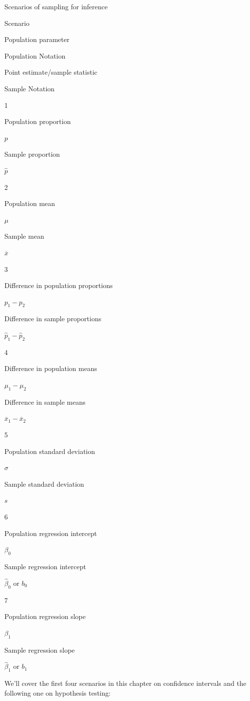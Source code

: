 \documentclass[12pt,]{krantz}
\begin{document}
\label{tab:summarytable}\label{tab:summarytable}Scenarios of sampling for
inference

Scenario

Population parameter

Population Notation

Point estimate/sample statistic

Sample Notation

1

Population proportion

\(p\)

Sample proportion

\(\widehat{p}\)

2

Population mean

\(\mu\)

Sample mean

\(\overline{x}\)

3

Difference in population proportions

\(p_1 - p_2\)

Difference in sample proportions

\(\widehat{p}_1 - \widehat{p}_2\)

4

Difference in population means

\(\mu_1 - \mu_2\)

Difference in sample means

\(\overline{x}_1 - \overline{x}_2\)

5

Population standard deviation

\(\sigma\)

Sample standard deviation

\(s\)

6

Population regression intercept

\(\beta_0\)

Sample regression intercept

\(\widehat{\beta}_0\) or \(b_0\)

7

Population regression slope

\(\beta_1\)

Sample regression slope

\(\widehat{\beta}_1\) or \(b_1\)

We'll cover the first four scenarios in this chapter on confidence
intervals and the following one on hypothesis testing:
\end{document}
